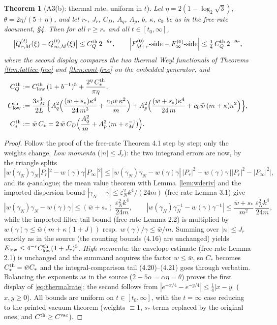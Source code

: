 \documentclass[11pt,a4paper]{article}
\theoremstyle{plain}
\newtheorem{theorem}{Theorem}[section]
\theoremstyle{definition}
\newcommand{\eps}{\varepsilon}
\begin{document}
\begin{theorem}[A3(b): thermal rate, uniform in $t$]\label{thm:thermalrate}
Let $\eta=2(1-\log_2\sqrt3)$, $\theta=2\eta/(5+\eta)$, and let
$r_*$, $J_r$, $C_D$, $A_q$, $A_p$, $b$, $\kappa$, $c_0$ be as in the free-rate
document, \S4. Then for all $r\ge r_*$ and all $t\in[t_0,\infty]$,
\begin{equation}
 \bigl|Q^{(t)}_{r,M}(\xi)-Q^{(t)}_{\infty,M}(\xi)\bigr|
 \le C^{\rm th}_Q\,2^{-\theta r},
 \qquad
 \Bigl|F^{(0)}_{M+r}\text{-side}-F^{(0)}_\infty\text{-side}\Bigr|
 \le\tfrac14\,C^{\rm th}_Q\,2^{-\theta r},
 \label{eq:thermalrate}
\end{equation}
where the second display compares the two thermal Weyl functionals of
Theorems \ref{thm:lattice-free} and \ref{thm:cont-free} on the embedded
generator, and
\begin{align}
 C^{\rm th}_Q&:=C^{\rm th}_{\rm low}\,(1+b^{-1})^{5}
 +\frac{2^{\eta}\,C^{\rm th}_*}{\pi\eta},
 \label{eq:CthQ}\\
 C^{\rm th}_{\rm low}
 &:=\frac{3\eps_M^3}{2L}
 \Bigl\{A_q^2\Bigl(\frac{(\bar w+s_*)\kappa^4}{24\,m^3}
 +\frac{c_0\bar w\,\kappa^2}{m}\Bigr)
 +A_p^2\Bigl(\frac{(\bar w+s_*)\kappa^4}{24\,m}
 +c_0\bar w\,(m+\kappa)\kappa^2\Bigr)\Bigr\},
 \nonumber\\
 C^{\rm th}_*&:=\bar w\,C_*
 =2\,\bar w\,C_D\Bigl(\frac{A_q^2}{m}+A_p^2\,(m+\eps_M^{-1})\Bigr).
 \nonumber
\end{align}
\end{theorem}

\begin{proof}
Follow the proof of the free-rate Theorem 4.1 step by step; only the weights
change. \emph{Low momenta} ($|n|\le J_r$): the two integrand errors are now,
by the triangle splits
\[
 |w(\gamma_N)\gamma_N|P_r|^2-w(\gamma)\gamma|P_\infty|^2|
 \le|w(\gamma_N)\gamma_N-w(\gamma)\gamma|\,|P_r|^2
 +w(\gamma)\gamma\,\bigl||P_r|^2-|P_\infty|^2\bigr|,
\]
and its $q$-analogue; the mean value theorem with Lemma~\ref{lem:wderiv} and
the imported dispersion bound $|\gamma_N-\gamma|\le\eps_N^2k^4/(24m)$
(free-rate Lemma 3.1) give
\[
 |w(\gamma_N)\gamma_N-w(\gamma)\gamma|
 \le(\bar w+s_*)\,\frac{\eps_N^2k^4}{24m},\qquad
 |w(\gamma_N)\gamma_N^{-1}-w(\gamma)\gamma^{-1}|
 \le\frac{\bar w+s_*}{m^2}\,\frac{\eps_N^2k^4}{24m},
\]
while the imported filter-tail bound (free-rate Lemma 2.2) is multiplied by
$w(\gamma)\gamma\le\bar w(m+\kappa(1+J))$ resp.\
$w(\gamma)/\gamma\le\bar w/m$. Summing over $|n|\le J_r$ exactly as in the
source (the counting bounds (4.16) are unchanged) yields
$E_{\rm low}\le4^{-r}C^{\rm th}_{\rm low}(1+J_r)^5$. \emph{High momenta}: the
envelope estimate (free-rate Lemma 2.1) is unchanged and the summand acquires
the factor $w\le\bar w$, so $C_*$ becomes $C^{\rm th}_*=\bar wC_*$ and the
integral-comparison tail (4.20)--(4.21) goes through verbatim. Balancing the
exponents as in the source ($2-5\alpha=\alpha\eta=\theta$) proves the first
display of \eqref{eq:thermalrate}; the second follows from
$|e^{-x/4}-e^{-y/4}|\le\tfrac14|x-y|$ ($x,y\ge0$). All bounds are uniform on
$t\in[t_0,\infty]$, with the $t=\infty$ case reducing to the printed vacuum
theorem (weights $\equiv1$, $s_*$-terms replaced by the original ones, and
$C^{\rm th}\ge C^{\rm vac}$).
\end{proof}
\end{document}
